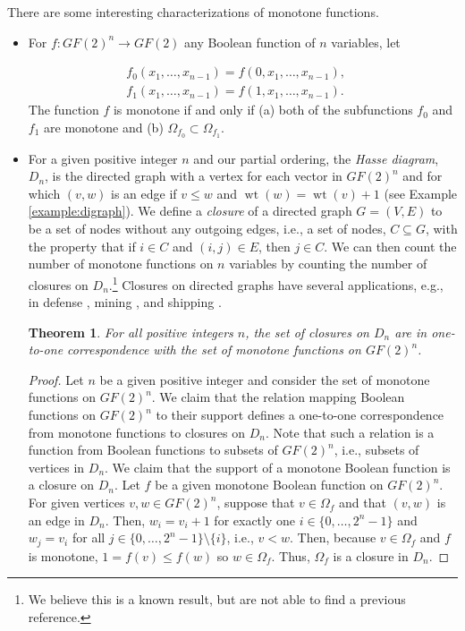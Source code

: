 \documentclass[12pt]{article}
\newtheorem{theorem}{Theorem}
\newcommand{\wt}{\mathop{wt}}
\begin{document}
There are some interesting characterizations of monotone functions.

\begin{itemize}
\item
For $f:GF(2)^n \to GF(2)$ any Boolean function of $n$ variables,
let

\[
\begin{array}{c}
f_0(x_1,\dots ,x_{n-1}) = f(0,x_1,\dots ,x_{n-1}),
\ \ \ \ \ \\
f_1(x_1,\dots ,x_{n-1}) = f(1,x_1,\dots ,x_{n-1}).
\end{array}
\]
The function $f$ is monotone if and only if
(a) both of the subfunctions $f_0$ and $f_1$ are
monotone and (b) $\Omega_{f_0} \subset \Omega_{f_1}$.

\item For a given positive integer $n$ and our partial ordering, the
  {\it Hasse diagram}, $D_n$, is the directed graph with a vertex for
  each vector in $GF(2)^n$ and for which $(v,w)$ is an edge if $v\leq
  w$ and $\wt(w)=\wt(v)+1$ (see Example \ref{example:digraph}).  We
  define a {\it closure} of a directed graph $G = (V,E)$ to be a set
  of nodes without any outgoing edges, i.e., a set of nodes, $C
  \subseteq G$, with the property that if $i \in C$ and $(i,j) \in E$,
  then $j \in C$. We can then count the number of monotone functions
  on $n$ variables by counting the number of closures on
  $D_n$.\footnote{We believe this is a known result, but are not able
    to find a previous reference.} Closures on directed graphs have
  several applications, e.g., in defense \cite{art:o87}, mining
  \cite{art:j68,art:hc00,art:bz10}, and shipping \cite{art:r70}.
  \begin{theorem}
    For all positive integers $n$, the set of closures on $D_n$ are in
    one-to-one correspondence with the set of monotone functions on
    $GF(2)^n$.
  \end{theorem}
  \begin{proof}
    Let $n$ be a given positive integer and consider the set of
    monotone functions on $GF(2)^n$. We claim that the relation
    mapping Boolean functions on $GF(2)^n$ to their support defines a
    one-to-one correspondence from monotone functions to closures on
    $D_n$. Note that such a relation is a function from Boolean
    functions to subsets of $GF(2)^n$, i.e., subsets of vertices in
    $D_n$. We claim that the support of a monotone Boolean function is
    a closure on $D_n$. Let $f$ be a given monotone Boolean function
    on $GF(2)^n$. For given vertices $v,w \in GF(2)^n$, suppose that
    $v \in \Omega_f$ and that $(v,w)$ is an edge in $D_n$. Then, $w_i
    = v_i + 1$ for exactly one $i \in \{0,\ldots,2^n-1\}$ and $w_j =
    v_i$ for all $j \in \{0,\ldots,2^n-1\} \setminus \{i\}$, i.e., $v
    < w$. Then, because $v \in \Omega_f$ and $f$ is monotone, $1 =
    f(v) \leq f(w)$ so $w \in \Omega_f$. Thus, $\Omega_f$ is a closure
    in $D_n$.


\end{proof}
\end{itemize}
\end{document}
